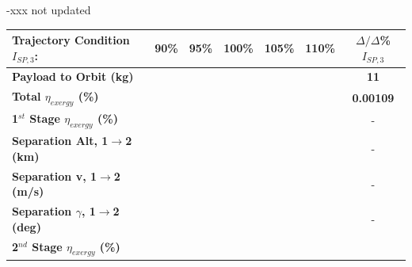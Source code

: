 -xxx not updated
\begin{table}[ht]%

	\centering
	\begin{tabular}{l c c c c c c} 
		\hline \textbf{Trajectory Condition}   \qquad  $I_{SP,3}$:
		&90\%
		&95\%
		&100\%
		&105\%
		&110\%
		& $\Delta/\Delta$\%$I_{SP,3}$
		\\
		\hline \textbf{Payload to Orbit (kg)}
		& \textbf{\PayloadToOrbitISPThreeNinety}
		& \textbf{\PayloadToOrbitISPThreeNinetyFive}
		& \textbf{\PayloadToOrbitISPThreeStandard}
		& \textbf{\PayloadToOrbitISPThreeOneHundredFive}
		& \textbf{\PayloadToOrbitISPThreeOneHundredTen}
		&\textbf{11}
		\\
		\textbf{Total $\eta_{exergy}$ (\%)}
		& \textbf{\totalExergyEffISPThreeNinety}
		& \textbf{\totalExergyEffISPThreeNinetyFive}
		& \textbf{\totalExergyEffISPThreeStandard}
		& \textbf{\totalExergyEffISPThreeOneHundredFive}
		& \textbf{\totalExergyEffISPThreeOneHundredTen}
		& \textbf{0.00109}
		\\
		\hline 
		\textbf{1$^{st}$ Stage $\eta_{exergy}$ (\%)}
		& \textbf{\firstExergyEffISPThreeNinety}
		& \textbf{\firstExergyEffISPThreeNinetyFive}
		& \textbf{\firstExergyEffISPThreeStandard}
		& \textbf{\firstExergyEffISPThreeOneHundredFive}
		& \textbf{\firstExergyEffISPThreeOneHundredTen}
		& -
		\\
		\textbf{Separation Alt, 1$\rightarrow$2 (km)}
		& \firstsecondSeparationAltISPThreeNinety
		& \firstsecondSeparationAltISPThreeNinetyFive
		& \firstsecondSeparationAltISPThreeStandard
		& \firstsecondSeparationAltISPThreeOneHundredFive
		& \firstsecondSeparationAltISPThreeOneHundredTen
		& -
		\\
		\textbf{Separation v, 1$\rightarrow$2 (m/s)}
		& \firstsecondSeparationvISPThreeNinety
		& \firstsecondSeparationvISPThreeNinetyFive
		& \firstsecondSeparationvISPThreeStandard
		& \firstsecondSeparationvISPThreeOneHundredFive
		& \firstsecondSeparationvISPThreeOneHundredTen
		& -
		\\
		\textbf{Separation $\gamma$, 1$\rightarrow$2 (deg)}
		& \firstsecondSeparationgammaISPThreeNinety
		& \firstsecondSeparationgammaISPThreeNinetyFive
		& \firstsecondSeparationgammaISPThreeStandard
		& \firstsecondSeparationgammaISPThreeOneHundredFive
		& \firstsecondSeparationgammaISPThreeOneHundredTen
		& -
		\\
		\hline 
		\textbf{2$^{nd}$ Stage $\eta_{exergy}$ (\%)}
		& \textbf{\secondExergyEffISPThreeNinety}
		& \textbf{\secondExergyEffISPThreeNinetyFive}
		& \textbf{\secondExergyEffISPThreeStandard}

\end{tabular}
\end{table}
